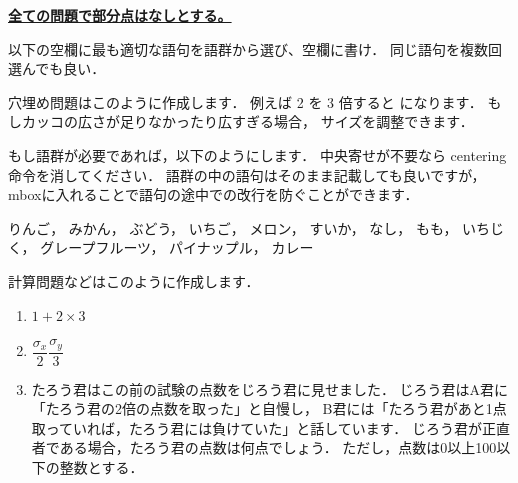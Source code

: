\documentclass[autodetect-engine,ja=standard,b4j,landscape,twoside]{bxjsarticle}
\renewcommand{\baselinestretch}{1.1} %
\begin{document}
\makeexamheader[6mm]

\vspace*{-5zh}
\underline{\bf 全ての問題で部分点はなしとする。}


\begin{mondai}
以下の空欄に最も適切な語句を語群から選び、空欄に書け．
同じ語句を複数回選んでも良い．

\vspace{1zh}
\renewcommand{\baselinestretch}{1.3}\selectfont
\setlength{\parindent}{1zw} %

穴埋め問題はこのように作成します．
例えば 2 を 3 倍すると  になります．
もしカッコの広さが足りなかったり広すぎる場合，
 サイズを調整できます．

もし語群が必要であれば，以下のようにします．
中央寄せが不要なら centering 命令を消してください．
語群の中の語句はそのまま記載しても良いですが，
mboxに入れることで語句の途中での改行を防ぐことができます．

\begin{語群}
\centering
\mbox{りんご}，
\mbox{みかん}，
\mbox{ぶどう}，
\mbox{いちご}，
\mbox{メロン}，
\mbox{すいか}，
\mbox{なし}，
\mbox{もも}，
\mbox{いちじく}，
\mbox{グレープフルーツ}，
\mbox{パイナップル}，
\mbox{カレー}
\end{語群}
\end{mondai}


\begin{mondai}
計算問題などはこのように作成します．
\begin{enumerate}
  \setlength{\itemsep}{2zh}
    \item $1 + 2 \times 3$

    \item $\dfrac{\sigma_x}{2} \dfrac{\sigma_y}{3}$

    \item たろう君はこの前の試験の点数をじろう君に見せました．
    じろう君はA君に「たろう君の2倍の点数を取った」と自慢し，
    B君には「たろう君があと1点取っていれば，たろう君には負けていた」と話しています．
    じろう君が正直者である場合，たろう君の点数は何点でしょう．
    ただし，点数は0以上100以下の整数とする．\\[1zh]
\end{enumerate}
\end{mondai}
\end{document}
